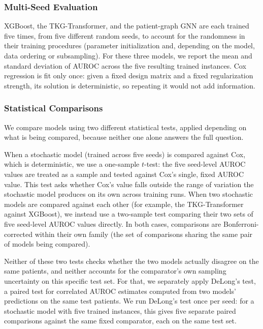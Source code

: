 \subsubsection{Multi-Seed Evaluation}

XGBoost, the TKG-Transformer, and the patient-graph GNN are each trained five times, from five different random seeds, to account for the randomness in their training procedures (parameter initialization and, depending on the model, data ordering or subsampling). For these three models, we report the mean and standard deviation of AUROC across the five resulting trained instances. Cox regression is fit only once: given a fixed design matrix and a fixed regularization strength, its solution is deterministic, so repeating it would not add information.

\subsubsection{Statistical Comparisons}
\label{sec:stats}

We compare models using two different statistical tests, applied depending on what is being compared, because neither one alone answers the full question.

When a stochastic model (trained across five seeds) is compared against Cox, which is deterministic, we use a one-sample $t$-test: the five seed-level AUROC values are treated as a sample and tested against Cox's single, fixed AUROC value. This test asks whether Cox's value falls outside the range of variation the stochastic model produces on its own across training runs. When two stochastic models are compared against each other (for example, the TKG-Transformer against XGBoost), we instead use a two-sample test comparing their two sets of five seed-level AUROC values directly. In both cases, comparisons are Bonferroni-corrected within their own family (the set of comparisons sharing the same pair of models being compared).

Neither of these two tests checks whether the two models actually disagree on the same patients, and neither accounts for the comparator's own sampling uncertainty on this specific test set. For that, we separately apply DeLong's test, a paired test for correlated AUROC estimates computed from two models' predictions on the same test patients. We run DeLong's test once per seed: for a stochastic model with five trained instances, this gives five separate paired comparisons against the same fixed comparator, each on the same test set.

